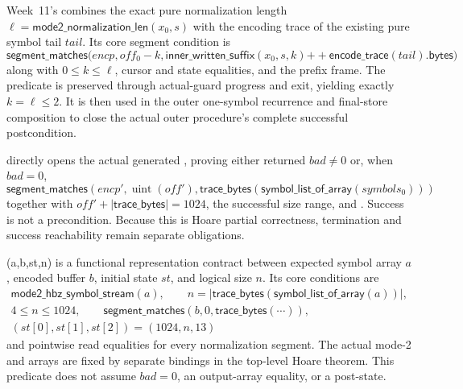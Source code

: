 \begin{definition}
\label{def:rans-tail-aware-inner}
Week~11's  combines the exact pure
normalization length \(\ell=\mathsf{mode2\_normalization\_len}(x_0,s)\) with the
encoding trace of the existing pure symbol tail \(tail\). Its core segment condition is
\[
  \mathsf{segment\_matches}\bigl(
    encp,off_0-k,
    \mathsf{inner\_written\_suffix}(x_0,s,k)\mathbin{++}
      \mathsf{encode\_trace}(tail).\mathsf{bytes}
  \bigr)
\]
along with \(0\le k\le\ell\), cursor and state equalities, and the prefix
frame. The predicate is preserved through actual-guard progress and exit,
yielding exactly \(k=\ell\le2\). It is then used in the outer one-symbol
recurrence and final-store composition to close the actual outer procedure's
complete successful postcondition.
\end{definition}

\begin{verified}
\label{thm:rans-encoder-suffix}
 directly opens the actual
generated , proving either returned \(bad\ne0\) or,
when \(bad=0\),
\[
  \mathsf{segment\_matches}
  (encp',\operatorname{uint}(off'),
   \mathsf{trace\_bytes}(\mathsf{symbol\_list\_of\_array}(symbols_0)))
\]
together with \(off'+|\mathsf{trace\_bytes}|=1024\), the successful size range,
and . Success is not a precondition. Because this is
Hoare partial correctness, termination and success reachability remain separate obligations.
\end{verified}

\begin{definition}
\label{def:rans-decoder-exact-input}
(a,b,st,n) is a functional
representation contract between expected symbol array \(a\), encoded buffer
\(b\), initial state \(st\), and logical size \(n\). Its core conditions are
\[
\begin{gathered}
  \mathsf{mode2\_hbz\_symbol\_stream}(a),\qquad
  n=|\mathsf{trace\_bytes}(\mathsf{symbol\_list\_of\_array}(a))|,\\
  4\le n\le1024,\qquad
  \mathsf{segment\_matches}(b,0,\mathsf{trace\_bytes}(\cdots)),\\
  (st[0],st[1],st[2])=(1024,n,13)
\end{gathered}
\]
and pointwise read equalities for every normalization segment. The actual
mode-2  and  arrays are fixed
by separate bindings in the top-level Hoare theorem. This predicate does not
assume \(bad=0\), an output-array equality, or a post-state.
\end{definition}

